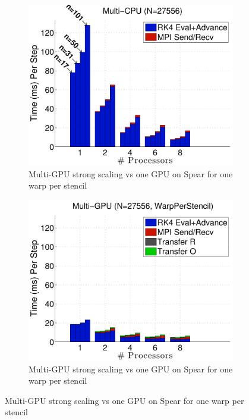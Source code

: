 \begin{figure}
\centering
\begin{subfigure}[t]{0.425\textwidth}
\centering
\includegraphics[width=1.0\textwidth]{../figures/spear_results/vortex/multiCPU_costs-eps-converted-to.pdf}
\caption{Multi-GPU strong scaling vs one GPU on Spear for one warp per stencil}
\label{fig:spear_alltoall_multigpu_vs_gpu_scaling}
\end{subfigure} 
\begin{subfigure}[t]{0.425\textwidth}
\centering
\includegraphics[width=1.0\textwidth]{../figures/spear_results/vortex/multiGPU_warp_costs-eps-converted-to.pdf}
\caption{Multi-GPU strong scaling vs one GPU on Spear for one warp per stencil}
\label{fig:spear_alltoall_multigpu_vs_gpu_scaling}
\end{subfigure} 
\end{figure} 

